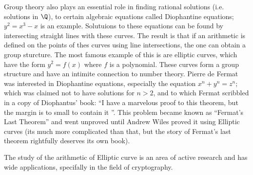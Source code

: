  Group theory also plays an essential role in finding rational solutions  (i.e.
 solutions in $\Q$), to certain algebraic equations called Diophantine
 equations; $y^2=x^3-x$ is an example. Solutuions to these equations can be
 found by intersecting straight lines with these curves. The result is that if
 an arithmetic is defined on the points of thes curves using line intersections,
 the one can obtain a group sturcture. The most famous example of this is are
 elliptic curves, which have the form  $y^2=f(x)$ where $f$ is a polynomial.
 These curves form a group structure and have an intimite connection to number
 theory. Pierre de Fermat was interested in Diophantine equations, especially
 the equation $x^n+y^n=z^n$; which was claimed not to have solutions for  $n>2$,
 and to which Fermat scribbled in a copy of Diophantus' book: ``I have a
 marvelous proof to this theorem, but the margin is to small to contain it ''.
 This problem became known as ``Fermat's Last Theorem'' and went unproved until
 Andrew Wiles proved it using Elliptic curves (its much more complicated than
 that, but the story of Fermat's last theorem rightfully deserves its own book).

 The study of the arithmetic of Elliptic curve is an area of active research and
 has wide applications, specifally in the field of cryptography.
